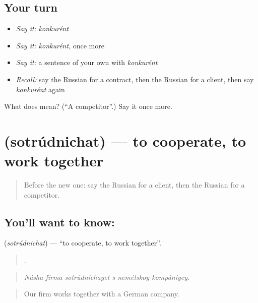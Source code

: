 \subsection*{Your turn}
\begin{itemize}
\raggedright
  \item \emph{Say it:} \emph{konkurént}
  \item \emph{Say it:} \emph{konkurént}, once more
  \item \emph{Say it:} a sentence of your own with \emph{konkurént}
  \item \emph{Recall:} say the Russian for a contract, then the Russian for a client, then say \emph{konkurént} again
\end{itemize}

\begin{tcolorbox}[breakable,colback=teal!4,colframe=teal!35!black,title={Before you move on}]
What does  mean? (\textquotedblleft{}A competitor\textquotedblright{}.) Say it once more.
\end{tcolorbox}
\section[\texorpdfstring{\ru{сотрудничать} (sotrúdnichat)}{сотрудничать (sotrúdnichat)}]{ (sotrúdnichat) — to cooperate, to work together}

\label{lesson:RU-C363-sotrudnichat}



\begin{quote}
Before the new one: say the Russian for a client, then the Russian for a competitor.
\end{quote}

\subsection*{You'll want to know: }
\textbf{} (\emph{sotrúdnichat}) — \textquotedblleft{}to cooperate, to work together\textquotedblright{}.

\begin{quote}
     .
\end{quote}

\begin{quote}
\emph{Násha fírma sotrúdnichayet s nemétskoy kompániyey.}
\end{quote}

\begin{quote}
Our firm works together with a German company.
\end{quote}

